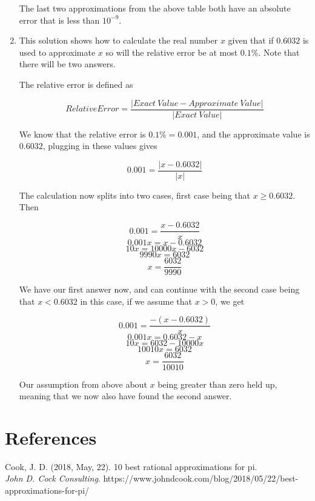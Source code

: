 \documentclass[10pt]{article}
\begin{document}
\begin{enumerate}
   The last two approximations from the above table both have an absolute error that is less than \( 10^{-9} \).

   \item This solution shows how to calculate the real number \( x \) given that if \( 0.6032 \) is used to approximate \( x \) so will the relative error be at most \( 0.1\% \). Note that there will be two answers.
   
   The relative error is defined as
   
   \[ Relative Error = \dfrac{\left| Exact \: Value - Approximate \: Value \right|}{\left| Exact \: Value\right|}\]
   
    We know that the relative error is \( 0.1\% = 0.001 \), and the approximate value is \( 0.6032 \), plugging in these values gives  
   
    \[ 0.001 = \dfrac{ \left| x - 0.6032 \right| }{ \left| x \right| } \]

    The calculation now splits into two cases, first case being that \( x \geq 0.6032 \). Then

    \[ 0.001 = \dfrac{ x - 0.6032 }{ x } \]
    \[ 0.001x =  x - 0.6032 \]
    \[ 10x =  10000x - 6032 \]
    \[ 9990x = 6032 \]
    \[ x = \dfrac{6032}{9990} \]

    We have our first answer now, and can continue with the second case being that \( x < 0.6032 \) in this case, if we assume that \( x > 0 \), we get

    \[ 0.001 = \dfrac{ -(x - 0.6032) }{ x } \]
    \[ 0.001x = 0.6032 - x \]
    \[ 10x =  6032 - 10000x \]
    \[ 10010x = 6032 \]
    \[ x = \dfrac{6032}{10010} \]

    Our assumption from above about \( x \) being greater than zero held up, meaning that we now also have found the second answer.

\end{enumerate}

\section{References}

Cook, J. D. (2018, May, 22). 10 best rational approximations for pi.\\
\textit{John D. Cock Consulting}. https://www.johndcook.com/blog/2018/05/22/best-approximations-for-pi/
\end{document}
